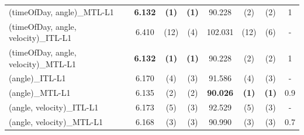 \documentclass[aspectratio=43,spanish]{beamer}
\newcommand{\fmaxn}[1]{\textbf{#1}}
\newcommand{\fmod}[1]{\textsf{#1}}
\begin{document}
\begin{frame}
\begin{table}[t!]
{\begin{tabular}{lccccccc}
            \fmod{(timeOfDay, angle)\_MTL-L1}             &   \fmaxn{6.132} & \fmaxn{(1)} & \fmaxn{(1)} &    90.228 & (2) & (2) & 1 \\
            \fmod{(timeOfDay, angle, velocity)\_ITL-L1}        &  6.410 & (12) & (4) &  102.031 & (12) & (6) & - \\
            \fmod{(timeOfDay, angle, velocity)\_MTL-L1} &   \fmaxn{6.132} & \fmaxn{(1)} & \fmaxn{(1)} &    90.228 & (2) & (2) & 1 \\
            \fmod{(angle)\_ITL-L1}                                 &   6.170 & (4) & (3) &    91.586 & (4) & (3) & - \\
            \fmod{(angle)\_MTL-L1}                          &   6.135 & (2) & (2) &    \fmaxn{90.026} & \fmaxn{(1)} & \fmaxn{(1)} & 0.9 \\
            \fmod{(angle, velocity)\_ITL-L1}                     &   6.173 & (5) & (3) &    92.529 & (5) & (3) & - \\
            \fmod{(angle, velocity)\_MTL-L1}              &   6.168 & (3) & (3) &    90.990 & (3) & (3) & 0.7 \\
            \bottomrule
            \end{tabular}
            }
        \end{table}

\end{frame}
  
  
  
\end{document}
